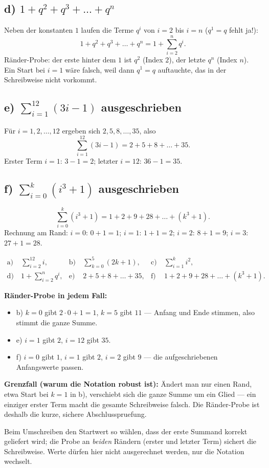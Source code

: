 \subsection*{d) $1+q^2+q^3+\dots+q^n$}
Neben der konstanten $1$ laufen die Terme $q^i$ von $i=2$ bis $i=n$
($q^1=q$ fehlt ja!):
\begin{equation}
  1+q^2+q^3+\dots+q^n = 1+\sum_{i=2}^{n} q^i .
\end{equation}
Ränder-Probe: der erste hinter dem $1$ ist $q^2$ (Index $2$), der letzte
$q^n$ (Index $n$). Ein Start bei $i=1$ wäre falsch, weil dann $q^1=q$
auftauchte, das in der Schreibweise nicht vorkommt.

\subsection*{e) $\sum_{i=1}^{12}(3i-1)$ ausgeschrieben}
Für $i=1,2,\dots,12$ ergeben sich $2,5,8,\dots,35$, also
\begin{equation}
  \sum_{i=1}^{12}(3i-1) = 2+5+8+\dots+35 .
\end{equation}
Erster Term $i=1$: $3-1=2$; letzter $i=12$: $36-1=35$. \checkmark

\subsection*{f) $\sum_{i=0}^{k}(i^3+1)$ ausgeschrieben}
\begin{equation}
  \sum_{i=0}^{k}(i^3+1)=1+2+9+28+\dots+(k^3+1) .
\end{equation}
Rechnung am Rand: $i=0$: $0+1=1$; $i=1$: $1+1=2$; $i=2$: $8+1=9$;
$i=3$: $27+1=28$. \checkmark

\begin{ergebnis}
\begin{align*}
  \text{a)}\ &\sum_{i=2}^{12} i, &
  \text{b)}\ &\sum_{k=0}^{5}(2k+1), &
  \text{c)}\ &\sum_{i=1}^{k} i^2,\\
  \text{d)}\ &1+\sum_{i=2}^{n}q^i, &
  \text{e)}\ &2+5+8+\dots+35, &
  \text{f)}\ &1+2+9+28+\dots+(k^3+1).
\end{align*}
\end{ergebnis}

\begin{kontrolle}
\textbf{Ränder-Probe in jedem Fall:}
\begin{itemize}
  \item b) $k=0$ gibt $2\cdot0+1=1$, $k=5$ gibt $11$ --- Anfang und Ende
        stimmen, also stimmt die ganze Summe.
  \item e) $i=1$ gibt $2$, $i=12$ gibt $35$.
  \item f) $i=0$ gibt $1$, $i=1$ gibt $2$, $i=2$ gibt $9$ --- die
        aufgeschriebenen Anfangswerte passen.
\end{itemize}

\textbf{Grenzfall (warum die Notation robust ist):} Ändert man nur einen
Rand, etwa Start bei $k=1$ in b), verschiebt sich die ganze Summe um ein
Glied --- ein einziger erster Term macht die gesamte Schreibweise falsch.
Die Ränder-Probe ist deshalb die kurze, sichere Abschlusspruefung.
\end{kontrolle}

\begin{merksatz}
Beim Umschreiben den Startwert so wählen, dass der erste Summand korrekt
geliefert wird; die Probe an \emph{beiden} Rändern (erster und letzter
Term) sichert die Schreibweise. Werte dürfen hier nicht ausgerechnet
werden, nur die Notation wechselt.
\end{merksatz}
